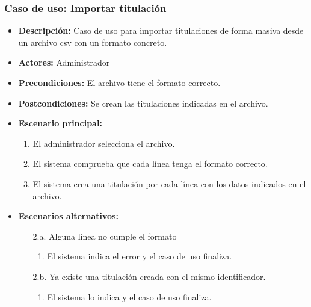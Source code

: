 \documentclass{book}
\begin{document}
\subsubsection*{Caso de uso: Importar titulación}
\begin{itemize}
\item{\bf Descripción:} Caso de uso para importar titulaciones de forma masiva desde un archivo csv con un formato concreto.
\item{\bf Actores:} Administrador
\item{\bf Precondiciones:} El archivo tiene el formato correcto.
\item{\bf Postcondiciones:} Se crean las titulaciones indicadas en el archivo.
\item{\bf Escenario principal:}
	\begin{enumerate}
	\item El administrador selecciona el archivo.
	\item El sistema comprueba que cada línea tenga el formato correcto.
	\item El sistema crea una titulación por cada línea con los datos indicados en el archivo.
	\end{enumerate}
\item{\bf Escenarios alternativos:}
	\begin{itemize}
		\item[2.a.] Alguna línea no cumple el formato
		\begin{enumerate}
			\item El sistema indica el error y el caso de uso finaliza.
		\end{enumerate}
		\item[2.b.] Ya existe una titulación creada con el mismo identificador.
		\begin{enumerate}
			\item El sistema lo indica y el caso de uso finaliza.
		\end{enumerate}
	\end{itemize}
\end{itemize}

\pagebreak
\end{document}
